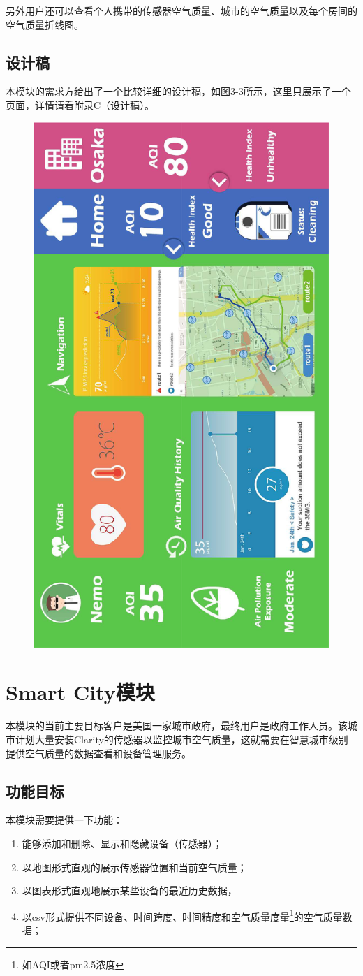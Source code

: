 另外用户还可以查看个人携带的传感器空气质量、城市的空气质量以及每个房间的空气质量折线图。
\subsection{设计稿}
本模块的需求方给出了一个比较详细的设计稿，如图3-3所示，这里只展示了一个页面，详情请看附录C（设计稿）。
\begin{figure}[!htp]
 \centering
 \includegraphics[height=0.9\linewidth, page=2, angle=-90]{pdf/robotic_design.pdf}
\end{figure}

\section{Smart City模块}
本模块的当前主要目标客户是美国一家城市政府，最终用户是政府工作人员。该城市计划大量安装Clarity的传感器以监控城市空气质量，这就需要在智慧城市级别提供空气质量的数据查看和设备管理服务。
\subsection{功能目标}
本模块需要提供一下功能：
\begin{enumerate}
  \item 能够添加和删除、显示和隐藏设备（传感器）；
  \item 以地图形式直观的展示传感器位置和当前空气质量；
  \item 以图表形式直观地展示某些设备的最近历史数据，
  \item 以csv形式提供不同设备、时间跨度、时间精度和空气质量度量\footnote{如AQI或者pm2.5浓度}的空气质量数据；
\end{enumerate}

